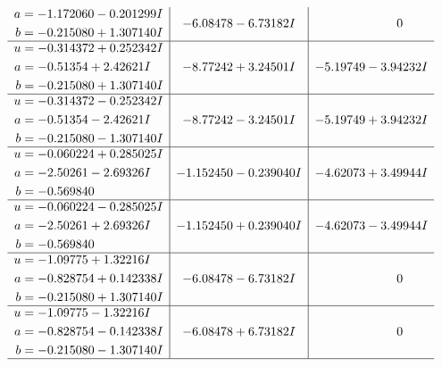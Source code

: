 \documentclass[1p]{elsarticle_modified}
\theoremstyle{definition}
\begin{document}
$$\begin{array}{c|c|c}
\begin{aligned}
a &= -1.172060 - 0.201299 I \\
b &= -0.215080 + 1.307140 I\end{aligned}
 & -6.08478 - 6.73182 I & \phantom{-0.000000 } 0 \\ \hline\begin{aligned}
u &= -0.314372 + 0.252342 I \\
a &= -0.51354 + 2.42621 I \\
b &= -0.215080 + 1.307140 I\end{aligned}
 & -8.77242 + 3.24501 I & -5.19749 - 3.94232 I \\ \hline\begin{aligned}
u &= -0.314372 - 0.252342 I \\
a &= -0.51354 - 2.42621 I \\
b &= -0.215080 - 1.307140 I\end{aligned}
 & -8.77242 - 3.24501 I & -5.19749 + 3.94232 I \\ \hline\begin{aligned}
u &= -0.060224 + 0.285025 I \\
a &= -2.50261 - 2.69326 I \\
b &= -0.569840\phantom{ +0.000000I}\end{aligned}
 & -1.152450 - 0.239040 I & -4.62073 + 3.49944 I \\ \hline\begin{aligned}
u &= -0.060224 - 0.285025 I \\
a &= -2.50261 + 2.69326 I \\
b &= -0.569840\phantom{ +0.000000I}\end{aligned}
 & -1.152450 + 0.239040 I & -4.62073 - 3.49944 I \\ \hline\begin{aligned}
u &= -1.09775 + 1.32216 I \\
a &= -0.828754 + 0.142338 I \\
b &= -0.215080 + 1.307140 I\end{aligned}
 & -6.08478 - 6.73182 I & \phantom{-0.000000 } 0 \\ \hline\begin{aligned}
u &= -1.09775 - 1.32216 I \\
a &= -0.828754 - 0.142338 I \\
b &= -0.215080 - 1.307140 I\end{aligned}
 & -6.08478 + 6.73182 I & \phantom{-0.000000 } 0\\
 \hline 
 \end{array}$$\newpage$$\begin{array}{c|c|c}  

\end{array}$$
\end{document}
